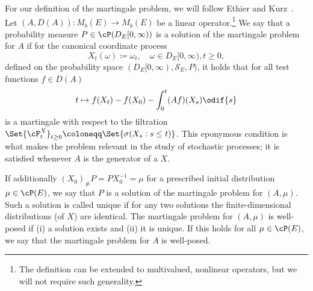   For our definition of the martingale problem, we will follow Ethier and Kurz~\cite[p.174]{ethierMarkovProcessesCharacterization1985}.
  Let \((A, D(A)) : M_b(E) \to M_b(E)\) be a linear operator.\footnote{The definition can be extended to multivalued, nonlinear operators, but we will not require such generality.}
  We say that a probability measure \(P \in \cP(D_E[0,\infty))\) is a solution of the martingale problem for \(A\) if for the canonical coordinate process
  \begin{equation}
    X_t(\omega) \coloneqq \omega_t, \quad \omega \in D_E[0,\infty), t \geq 0,
  \end{equation}
  defined on the probability space \((D_E[0,\infty), \mathscr{S}_E, P)\), it holds that for all test functions \(f \in D(A)\)
  \begin{equation}
    t \mapsto f(X_t) - f(X_0) - \int_0^t (Af)(X_s) \odif{s}
  \end{equation}
  is a martingale with respect to the filtration \(\Set{\cF_t^X}_{t\geq0} \coloneqq \Set{\sigma(X_s : s \leq t)}\). %
  This eponymous condition is what makes the problem relevant in the study of stochastic processes; it is satisfied whenever \(A\) is the generator of a \(X\).

  If additionally \((X_0)_\# P = P X_0^{-1} = \mu\) for a prescribed initial distribution \(\mu \in \cP(E)\), we say that \(P\) is a solution of the martingale problem for \((A,\mu)\).
  Such a solution is called unique if for any two solutions the finite-dimensional distributions (of \(X\)) are identical.
  The martingale problem for \((A,\mu)\) is well-posed if (i) a solution exists and (ii) it is unique.
  If this holds for all \(\mu \in \cP(E)\), we say that the martingale problem for \(A\) is well-posed.

